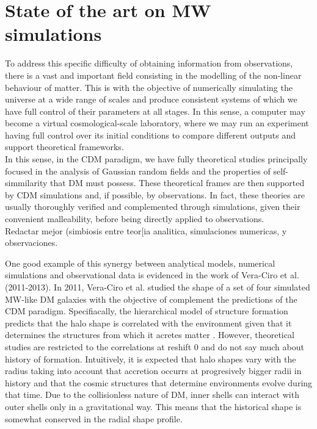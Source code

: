 \section{State of the art on MW simulations}
To address this specific difficulty of obtaining information from observations, there is a vast and important field consisting in the modelling of the non-linear behaviour of matter. 
This is with the objective of numerically simulating the universe at a wide range of scales and produce consistent systems of which we have  full control of their parameters at all stages. 
In this sense, a computer may become a virtual cosmological-scale laboratory, where we may run an experiment having full control over its initial conditions to compare different outputs and support theoretical frameworks. \\

In this sense, in the CDM paradigm, we have fully theoretical studies \cite{Bardeen et al. 1986,Schechter} principally focused in the analysis of Gaussian random fields and the properties of self-simmilarity that DM must possess. 
These theoretical frames are then supported by CDM simulations \cite{Cualquier estudio de CDM hace referencia a esos pilares} and, if possible, by observations. In fact, these theories are usually thoroughly verified and complemented through simulations, given their convenient malleability, before being directly applied to observations.\\ Redactar mejor (simbiosis entre teor[ia analitica, simulaciones numericas, y observaciones.

One good example of this synergy between analytical models, numerical simulations and observational data is evidenced in the work of Vera-Ciro et al. (2011-2013). In 2011, Vera-Ciro et al. studied the shape of a set of four simulated MW-like DM galaxies with the objective of complement the predictions of the CDM paradigm. Specifiacally, the hierarchical model of structure formation predicts that the halo shape is correlated with the environment given that it determines the structures from which it acretes matter \cite{referencias sobre relacion entre forma y entorno}. However, theoretical studies are restricted to the correlations at reshift 0 and do not say much about history of formation. Intuitively, it is expected that halo shapes vary with the radius taking into account that accretion occurrs at progresively bigger radii in history and that the cosmic structures that determine environments evolve during that time. Due to the collisionless nature of DM, inner shells can interact with outer shells only in a gravitational way. This means that the historical shape is somewhat conserved in the radial shape profile.\\

